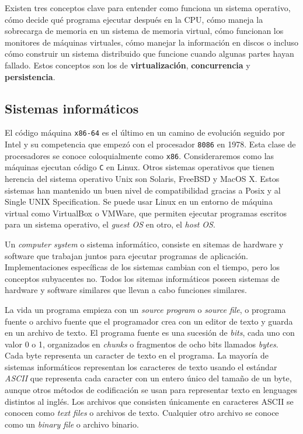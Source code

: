
Existen tres conceptos clave para entender como funciona un sistema operativo, cómo decide qué programa ejecutar después en la CPU, cómo maneja la sobrecarga de memoria en un sistema de memoria virtual, cómo funcionan los monitores de máquinas virtuales, cómo manejar la información en discos o incluso cómo construir un sistema distribuido que funcione cuando algunas partes hayan fallado. Estos conceptos son los de \textbf{virtualización}, \textbf{concurrencia} y \textbf{persistencia}.

\subsection{Sistemas informáticos}

El código máquina \texttt{x86-64} es el último en un camino de evolución seguido por Intel y su competencia que empezó con el procesador \texttt{8086} en 1978. Esta clase de procesadores se conoce coloquialmente como \texttt{x86}. Consideraremos como las máquinas ejecutan código \texttt{C} en Linux. Otros sistemas operativos que tienen herencia del sistema operativo Unix son Solaris, FreeBSD y MacOS X. Estos sistemas han mantenido un buen nivel de compatibilidad gracias a Posix y al Single UNIX Specification. Se puede usar Linux en un entorno de máquina virtual como VirtualBox o VMWare, que permiten ejecutar programas escritos para un sistema operativo, el \textit{guest OS} en otro, el \textit{host OS}.
\bigskip

Un \emph{computer system} o sistema informático, consiste en sitemas de hardware y software que trabajan juntos para ejecutar programas de aplicación. Implementaciones específicas de los sistemas cambian con el tiempo, pero los conceptos subyacentes no. Todos los sitemas informáticos poseen sistemas de hardware y software similares que llevan a cabo funciones similares.
\bigskip

La vida un programa empieza con un \textit{source program} o \textit{source file}, o programa fuente o archivo fuente que el programador crea con un editor de texto y guarda en un archivo de texto. El programa fuente es una sucesión de \textit{bits}, cada uno con valor 0 o 1, organizados en \textit{chunks} o fragmentos de ocho bits llamados \textit{bytes}. Cada byte representa un caracter de texto en el programa. La mayoría de sistemas informáticos representan los caracteres de texto usando el estándar \textit{ASCII} que representa cada caracter con un entero único del tamaño de un byte, aunque otros métodos de codificación se usan para representar texto en lenguages distintos al inglés. Los archivos que consisten únicamente en caracteres ASCII se conocen como \textit{text files} o archivos de texto. Cualquier otro archivo se conoce como un \textit{binary file} o archivo binario.
\bigskip

